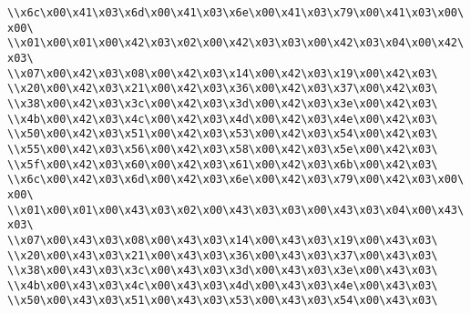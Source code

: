 \verb|\\x6c\x00\x41\x03\x6d\x00\x41\x03\x6e\x00\x41\x03\x79\x00\x41\x03\x00\x00\|\newline
\verb|\\x01\x00\x01\x00\x42\x03\x02\x00\x42\x03\x03\x00\x42\x03\x04\x00\x42\x03\|\newline
\verb|\\x07\x00\x42\x03\x08\x00\x42\x03\x14\x00\x42\x03\x19\x00\x42\x03\|\newline
\verb|\\x20\x00\x42\x03\x21\x00\x42\x03\x36\x00\x42\x03\x37\x00\x42\x03\|\newline
\verb|\\x38\x00\x42\x03\x3c\x00\x42\x03\x3d\x00\x42\x03\x3e\x00\x42\x03\|\newline
\verb|\\x4b\x00\x42\x03\x4c\x00\x42\x03\x4d\x00\x42\x03\x4e\x00\x42\x03\|\newline
\verb|\\x50\x00\x42\x03\x51\x00\x42\x03\x53\x00\x42\x03\x54\x00\x42\x03\|\newline
\verb|\\x55\x00\x42\x03\x56\x00\x42\x03\x58\x00\x42\x03\x5e\x00\x42\x03\|\newline
\verb|\\x5f\x00\x42\x03\x60\x00\x42\x03\x61\x00\x42\x03\x6b\x00\x42\x03\|\newline
\verb|\\x6c\x00\x42\x03\x6d\x00\x42\x03\x6e\x00\x42\x03\x79\x00\x42\x03\x00\x00\|\newline
\verb|\\x01\x00\x01\x00\x43\x03\x02\x00\x43\x03\x03\x00\x43\x03\x04\x00\x43\x03\|\newline
\verb|\\x07\x00\x43\x03\x08\x00\x43\x03\x14\x00\x43\x03\x19\x00\x43\x03\|\newline
\verb|\\x20\x00\x43\x03\x21\x00\x43\x03\x36\x00\x43\x03\x37\x00\x43\x03\|\newline
\verb|\\x38\x00\x43\x03\x3c\x00\x43\x03\x3d\x00\x43\x03\x3e\x00\x43\x03\|\newline
\verb|\\x4b\x00\x43\x03\x4c\x00\x43\x03\x4d\x00\x43\x03\x4e\x00\x43\x03\|\newline
\verb|\\x50\x00\x43\x03\x51\x00\x43\x03\x53\x00\x43\x03\x54\x00\x43\x03\|\newline
